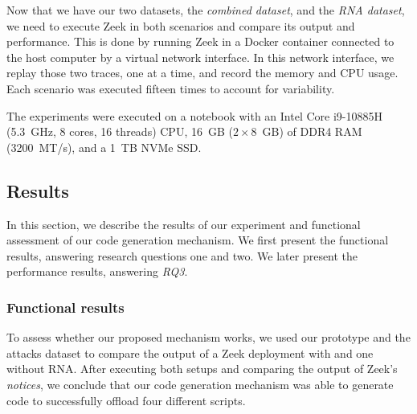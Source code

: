 Now that we have our two datasets, the \textit{combined dataset}, and the \textit{RNA dataset}, we need to execute Zeek in both scenarios and compare its output and performance. This is done by running Zeek in a Docker container connected to the host computer by a virtual network interface. In this network interface, we replay those two traces, one at a time, and record the memory and CPU usage. Each scenario was executed fifteen times to account for variability.

The experiments were executed on a notebook with an Intel Core i9-10885H (\SI{5.3}{GHz}, 8 cores, 16 threads) CPU, \SI{16}{GB} ($2 \times$\SI{8}{GB}) of DDR4 RAM (\SI{3200}{MT/s}), and a \SI{1}{TB} NVMe SSD.





\subsection{Results}

In this section, we describe the results of our experiment and functional assessment of our code generation mechanism. We first present the functional results, answering research questions one and two. We later present the performance results, answering \textit{RQ3}.

\subsubsection*{Functional results}

To assess whether our proposed mechanism works, we used our prototype and the attacks dataset to compare the output of a Zeek deployment with and one without RNA. After executing both setups and comparing the output of Zeek's \textit{notices}, we conclude that our code generation mechanism was able to generate code to successfully offload four different scripts.

